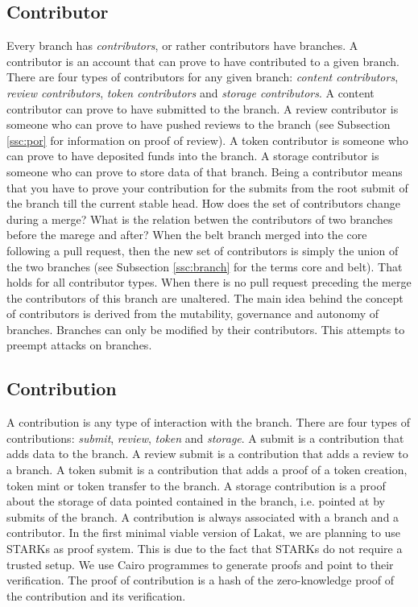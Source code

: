 \subsection{Contributor}
\label{ssc:contributors}
Every branch has \textit{contributors}, or rather contributors have branches. A contributor is an account that can prove to have contributed to a given branch. There are four types of contributors for any given branch: \textit{content contributors}, \textit{review contributors}, \textit{token contributors} and \textit{storage contributors}. A content contributor can prove to have submitted to the branch. A review contributor is someone who can prove to have pushed reviews to the branch (see Subsection \ref{ssc:por} for information on proof of review). A token contributor is someone who can prove to have deposited funds into the branch. A storage contributor is someone who can prove to store data of that branch. Being a contributor means that you have to prove your contribution for the submits from the root submit of the branch till the current stable head.
How does the set of contributors change during a merge? What is the relation betwen the contributors of two branches before the marege and after? When the belt branch merged into the core following a pull request, then the new set of contributors is simply the union of the two branches (see Subsection \ref{ssc:branch} for the terms core and belt). That holds for all contributor types. When there is no pull request preceding the merge the contributors of this branch are unaltered.
The main idea behind the concept of contributors is derived from the mutability, governance and autonomy of branches. Branches can only be modified by their contributors. This attempts to preempt attacks on branches.


\subsection{Contribution}
\label{ssc:contribution}

A contribution is any type of interaction with the branch. There are four types of contributions: \textit{submit}, \textit{review}, \textit{token} and \textit{storage}. A submit is a contribution that adds data to the branch. A review submit is a contribution that adds a review to a branch. A token submit is a contribution that adds a proof of a token creation, token mint or token transfer to the branch. A storage contribution is a proof about the storage of data pointed contained in the branch, i.e. pointed at by submits of the branch. A contribution is always associated with a branch and a contributor. In the first minimal viable version of Lakat, we are planning to use STARKs \cite{} as proof system. This is due to the fact that STARKs do not require a trusted setup. We use Cairo programmes to generate proofs and point to their verification. The proof of contribution is a hash of the zero-knowledge proof of the contribution and its verification.

